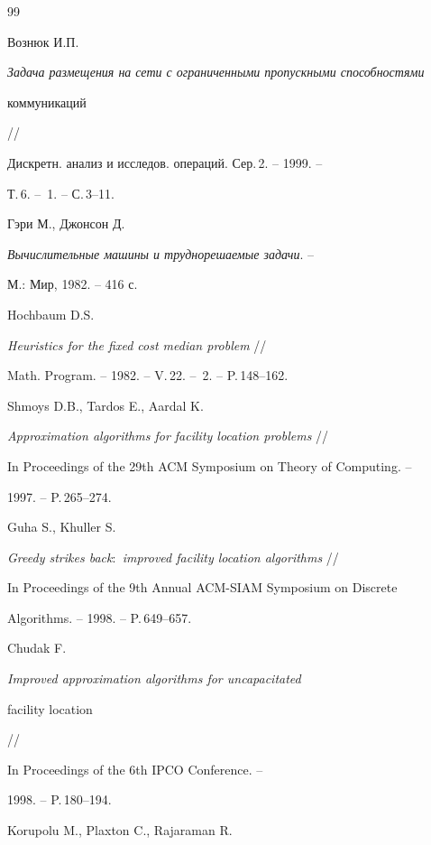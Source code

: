 \begin{thebibliography}{99}







Вознюк И.П. 


{\em Задача размещения на сети с ограниченными пропускными способностями


коммуникаций} //


Дискретн. анализ и исследов. операций. Сер.\,2. -- 1999. -- 


Т.\,6. -- \No\,1. -- С.\,3--11.




Гэри М., Джонсон Д. 


{\em Вычислительные машины и труднорешаемые задачи}. -- 


М.: Мир, 1982. -- 416 с.




Hochbaum D.S. 


{\em Heuristics for the fixed cost median problem} //


Math. Program. -- 1982. -- V.\,22. -- \No\,2. -- P.\,148--162.




Shmoys D.B., Tardos E., Aardal K. 


{\em Approximation algorithms for facility location problems} //


In Proceedings of the 29th ACM Symposium on Theory of Computing. -- 


1997. -- P.\,265--274.




Guha S., Khuller S.


{\em Greedy strikes back$:$ improved facility location algorithms} //


In Proceedings of the 9th Annual ACM-SIAM Symposium on Discrete 


Algorithms. -- 1998. -- P.\,649--657.




Chudak F.


{\em Improved approximation algorithms for uncapacitated


facility location} //


In Proceedings of the 6th IPCO Conference. -- 


1998. -- P.\,180--194.




Korupolu M., Plaxton C., Rajaraman R.



\end{thebibliography}
